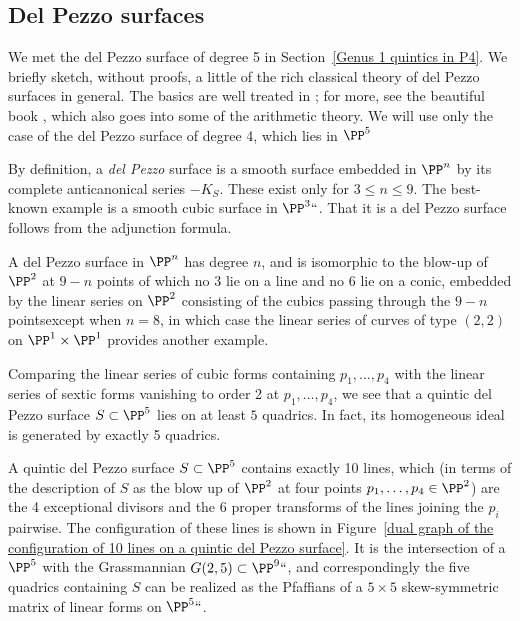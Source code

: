 \subsection{Del Pezzo surfaces}\label{Del Pezzo sketch}

We  met the del Pezzo surface of degree 5 in Section~\ref{Genus 1 quintics
in P4}.
We briefly sketch, without proofs, a little of the
 rich classical theory of del Pezzo surfaces in general. The basics are
 well treated in \cite[pp.~45--50]{Beauville}; for more, see the
beautiful book \cite{Manin}, which also goes into some of the arithmetic
%
%
theory. We will use only the case of the del Pezzo surface of degree 4,
which lies in $\PP^{5}$

By definition,
a \emph{del Pezzo} surface is a smooth surface embedded in $\PP^n$  by
its complete anticanonical series $-K_S$. These exist only for $3\leq
n\leq 9$. The best-known example is a smooth cubic surface in $\PP^3``$.
That it is a del Pezzo surface follows from the adjunction formula.

A del Pezzo surface in $\PP^n$ has degree $n$, and is isomorphic to the
blow-up of $\PP^2$ at $9-n$ points of which no 3 lie on a line and no
6 lie on a conic, embedded by the linear series on $\PP^2$
consisting of the cubics passing through the $9-n$ points\emdash except
when $n=8$, in which case the
linear series of curves of type $(2,2)$ on $\PP^1\times \PP^1$ provides
another example.

Comparing the linear series  of cubic forms containing $p_1,\dots,p_4$
with the linear series  of sextic forms vanishing to order 2 at
$p_1,\dots,p_4$, we see that a quintic del Pezzo surface $S \subset \PP^5$
lies on at least $5$ quadrics. In fact, its homogeneous ideal is generated
by exactly 5 quadrics.

A quintic del Pezzo surface $S \subset \PP^5$ contains exactly 10 lines,
which (in terms of the description of $S$ as the blow up of $\PP^2$ at
four points $p_1,\dots,p_4 \in \PP^2$) are the 4 exceptional divisors
and the 6 proper transforms of the lines joining the $p_i$ pairwise. The
configuration of these lines is shown in Figure~\ref{dual graph of the
configuration of 10 lines on a quintic del Pezzo surface}.
It is the intersection of a $\PP^5$ with the Grassmannian $G(2,5)
\subset \PP^9` `$, and correspondingly the five quadrics containing $S$
can be realized as the Pfaffians of a  $5\times 5$ skew-symmetric matrix
of linear forms on $\PP^5` `$.

